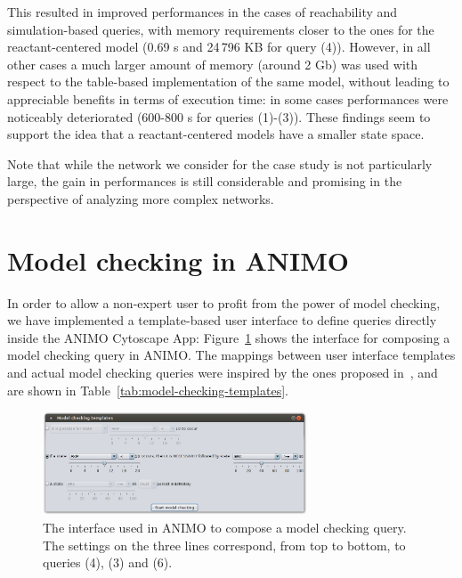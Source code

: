 \documentclass{llncs}
\begin{document}
This resulted in improved performances in the cases of reachability and simulation-based queries, with memory requirements closer to the ones for
the reactant-centered model (0.69 s and 24\,{}796 KB for query (4)). However, in all other cases a much larger amount of memory (around 2 Gb) was used
with respect to the table-based implementation of the same model, without leading to appreciable benefits in terms of execution time:
in some cases performances were noticeably deteriorated (600-800 s for queries (1)-(3)).
These findings seem to support the idea that a reactant-centered models
have a smaller state space.

Note that while the network we consider for the case study is not particularly large, the gain in performances is still considerable
and promising in the perspective of analyzing more complex networks.



\section{Model checking in ANIMO}\label{sec:animo-model-checking-ui}
In order to allow a non-expert user to profit from the power of model checking, we have implemented
a template-based user interface to define queries directly inside the ANIMO Cytoscape App:
Figure~\ref{fig:model-checking-ui} shows the interface for composing a model checking query in ANIMO.
The mappings between user interface templates and actual model checking queries were inspired
by the ones proposed in~\cite{hidde-templates}, and are shown in Table~\ref{tab:model-checking-templates}.

\begin{figure}[htb]
  \begin{center}
    \includegraphics[width=0.7\textwidth]{images/model_checking_ui}
  \end{center}
  \caption{The interface used in ANIMO to compose a model checking query.
  The settings on the three lines correspond, from top to bottom,
  to queries (4), (3) and (6).\label{fig:model-checking-ui}}
\end{figure}
\end{document}
